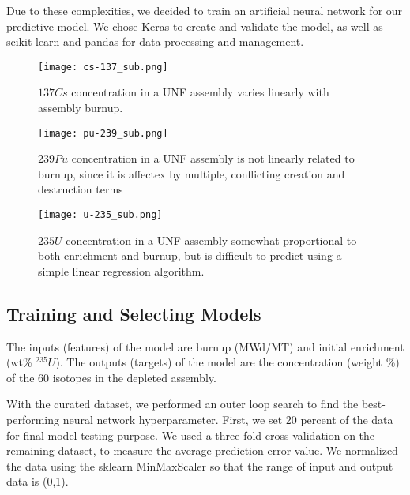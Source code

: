 Due to these complexities, we decided to train an artificial
neural network for our predictive model. We chose
Keras \cite{collet_keras_2015} to create and validate the model,
as well as scikit-learn \cite{pedregosa_scikit-learn_2011}
and pandas \cite{mckinney-proc-scipy-2010} for data processing and management.

\begin{figure}
    \centering
    \texttt{[image: cs-137\_sub.png]}
    \caption{${137}Cs$ concentration in a \gls{UNF} assembly
             varies linearly with assembly burnup.}
    \label{fig:cs_137}
\end{figure}

\begin{figure}
    \centering
    \texttt{[image: pu-239\_sub.png]}
    \caption{${239}Pu$ concentration in a \gls{UNF} assembly
             is not linearly related to burnup, since it
             is affectex by multiple, conflicting creation
             and destruction terms}
    \label{fig:pu_239}
\end{figure}


\begin{figure}
    \centering
    \texttt{[image: u-235\_sub.png]}
    \caption{${235}U$ concentration in a \gls{UNF} assembly
             somewhat proportional to both enrichment and
             burnup, but is difficult to predict using
             a simple linear regression algorithm.}
    \label{fig:u_235}
\end{figure}


\subsection{Training and Selecting Models}

The inputs (features) of the model are
burnup (MWd/MT) and initial enrichment (wt\% $^{235}U$).
The outputs (targets) of the model are
the concentration (weight \%) of the 60 isotopes in the
depleted assembly.

With the curated dataset, we performed an outer loop
search to find the best-performing neural network
hyperparameter. First, we set 20 percent of the 
data for final model testing purpose. We used a three-fold
cross validation \cite{stone1974cross} on the remaining
dataset, to
measure the average prediction error value. We
normalized the data using the sklearn MinMaxScaler
so that the range of input and output data is (0,1).

